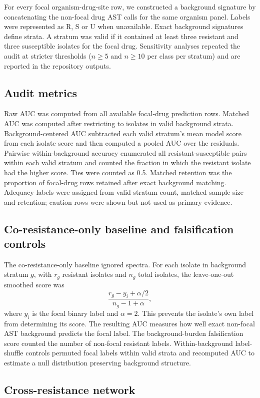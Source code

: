\documentclass[11pt]{article}
\begin{document}
For every focal organism-drug-site row, we constructed a background signature by concatenating the non-focal drug AST calls for the same organism panel. Labels were represented as R, S or U when unavailable. Exact background signatures define strata. A stratum was valid if it contained at least three resistant and three susceptible isolates for the focal drug. Sensitivity analyses repeated the audit at stricter thresholds ($n\geq5$ and $n\geq10$ per class per stratum) and are reported in the repository outputs.

\subsection*{Audit metrics}

Raw AUC was computed from all available focal-drug prediction rows. Matched AUC was computed after restricting to isolates in valid background strata. Background-centered AUC subtracted each valid stratum's mean model score from each isolate score and then computed a pooled AUC over the residuals. Pairwise within-background accuracy enumerated all resistant-susceptible pairs within each valid stratum and counted the fraction in which the resistant isolate had the higher score. Ties were counted as 0.5. Matched retention was the proportion of focal-drug rows retained after exact background matching. Adequacy labels were assigned from valid-stratum count, matched sample size and retention; caution rows were shown but not used as primary evidence.

\subsection*{Co-resistance-only baseline and falsification controls}

The co-resistance-only baseline ignored spectra. For each isolate in background stratum $g$, with $r_g$ resistant isolates and $n_g$ total isolates, the leave-one-out smoothed score was
\[
  \frac{r_g-y_i+\alpha/2}{n_g-1+\alpha},
\]
where $y_i$ is the focal binary label and $\alpha=2$. This prevents the isolate's own label from determining its score. The resulting AUC measures how well exact non-focal AST background predicts the focal label. The background-burden falsification score counted the number of non-focal resistant labels. Within-background label-shuffle controls permuted focal labels within valid strata and recomputed AUC to estimate a null distribution preserving background structure.

\subsection*{Cross-resistance network}
\end{document}
